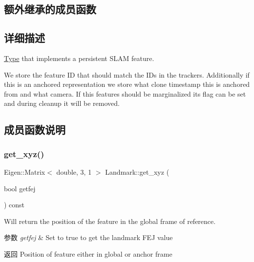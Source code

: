 \subsection*{额外继承的成员函数}


\subsection{详细描述}
\hyperlink{classov__type_1_1Type}{Type} that implements a persistent S\+L\+AM feature. 

We store the feature ID that should match the I\+Ds in the trackers. Additionally if this is an anchored representation we store what clone timestamp this is anchored from and what camera. If this features should be marginalized its flag can be set and during cleanup it will be removed. 

\subsection{成员函数说明}
\mbox{\label{classov__type_1_1Landmark_aa4f66d5e3954beea3f05b8b757561132}} 
\subsubsection{\texorpdfstring{get\+\_\+xyz()}{get\_xyz()}}
{\footnotesize\ttfamily Eigen\+::\+Matrix$<$ double, 3, 1 $>$ Landmark\+::get\+\_\+xyz (\begin{DoxyParamCaption}\item[{bool}]{getfej }\end{DoxyParamCaption}) const}



Will return the position of the feature in the global frame of reference. 


\begin{DoxyParams}{参数}
{\em getfej} & Set to true to get the landmark F\+EJ value \\
\hline
\end{DoxyParams}
\begin{DoxyReturn}{返回}
Position of feature either in global or anchor frame 
\end{DoxyReturn}
\mbox{\label{classov__type_1_1Landmark_ac34319e2057c3c63154cef9a9aa08a2e}} 
